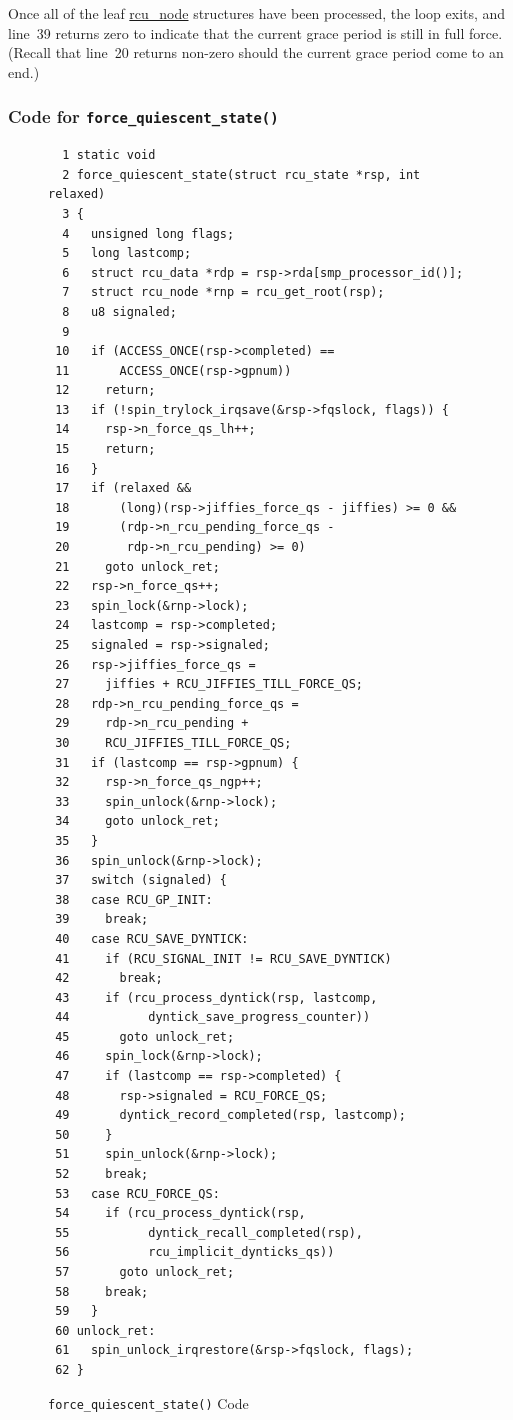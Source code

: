 Once all of the leaf \url{rcu_node} structures have been processed,
the loop exits, and line~39 returns zero to indicate that the current
grace period is still in full force.
(Recall that line~20 returns non-zero should the current grace period
come to an end.)

\subsubsection{Code for {\tt force\_quiescent\_state()}}
\label{app:rcuimpl:rcutreewt:Code for force-quiescent-state}

\begin{figure}[tbp]
{ \scriptsize
\begin{verbatim}
  1 static void
  2 force_quiescent_state(struct rcu_state *rsp, int relaxed)
  3 {
  4   unsigned long flags;
  5   long lastcomp;
  6   struct rcu_data *rdp = rsp->rda[smp_processor_id()];
  7   struct rcu_node *rnp = rcu_get_root(rsp);
  8   u8 signaled;
  9 
 10   if (ACCESS_ONCE(rsp->completed) ==
 11       ACCESS_ONCE(rsp->gpnum))
 12     return;
 13   if (!spin_trylock_irqsave(&rsp->fqslock, flags)) {
 14     rsp->n_force_qs_lh++;
 15     return;
 16   }
 17   if (relaxed &&
 18       (long)(rsp->jiffies_force_qs - jiffies) >= 0 &&
 19       (rdp->n_rcu_pending_force_qs -
 20        rdp->n_rcu_pending) >= 0)
 21     goto unlock_ret;
 22   rsp->n_force_qs++;
 23   spin_lock(&rnp->lock);
 24   lastcomp = rsp->completed;
 25   signaled = rsp->signaled;
 26   rsp->jiffies_force_qs =
 27     jiffies + RCU_JIFFIES_TILL_FORCE_QS;
 28   rdp->n_rcu_pending_force_qs =
 29     rdp->n_rcu_pending +
 30     RCU_JIFFIES_TILL_FORCE_QS;
 31   if (lastcomp == rsp->gpnum) {
 32     rsp->n_force_qs_ngp++;
 33     spin_unlock(&rnp->lock);
 34     goto unlock_ret;
 35   }
 36   spin_unlock(&rnp->lock);
 37   switch (signaled) {
 38   case RCU_GP_INIT:
 39     break;
 40   case RCU_SAVE_DYNTICK:
 41     if (RCU_SIGNAL_INIT != RCU_SAVE_DYNTICK)
 42       break;
 43     if (rcu_process_dyntick(rsp, lastcomp,
 44           dyntick_save_progress_counter))
 45       goto unlock_ret;
 46     spin_lock(&rnp->lock);
 47     if (lastcomp == rsp->completed) {
 48       rsp->signaled = RCU_FORCE_QS;
 49       dyntick_record_completed(rsp, lastcomp);
 50     }
 51     spin_unlock(&rnp->lock);
 52     break;
 53   case RCU_FORCE_QS:
 54     if (rcu_process_dyntick(rsp,
 55           dyntick_recall_completed(rsp),
 56           rcu_implicit_dynticks_qs))
 57       goto unlock_ret;
 58     break;
 59   }
 60 unlock_ret:
 61   spin_unlock_irqrestore(&rsp->fqslock, flags);
 62 }
\end{verbatim}
}
\caption{{\tt force\_quiescent\_state()} Code}
\label{fig:app:rcuimpl:rcutreewt:Code for rcutree force-quiescent-state}
\end{figure}

